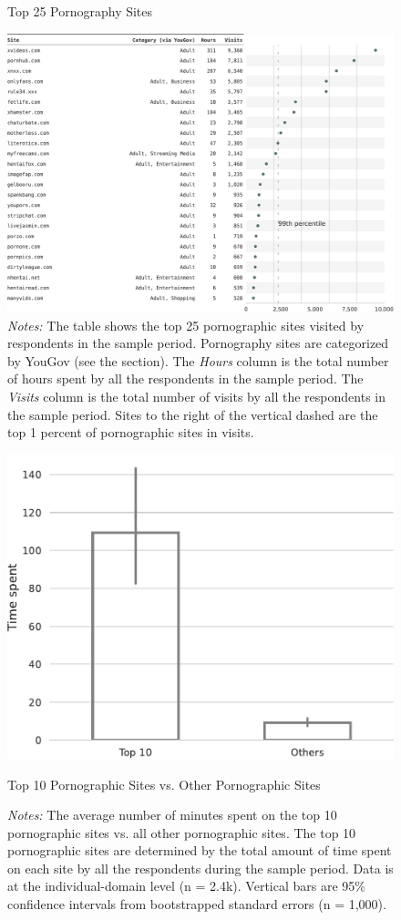 \documentclass[12pt,twoside]{article}
\begin{document}
\begin{figure}[ht]
	\centering
	\caption{Top 25 Pornography Sites}
	\includegraphics[width=\textwidth]{figs/top_25_adultsites.pdf}
	\caption*{\footnotesize \emph{Notes:} 
		The table shows the top 25 pornographic sites visited by respondents in the sample period. Pornography sites are categorized by YouGov (see the  section).
    	The \emph{Hours} column is the total number of hours spent by all the respondents in the sample period.
    	The \emph{Visits} column is the total number of visits by all the respondents in the sample period.
            Sites to the right of the vertical dashed are the top 1 percent of pornographic sites in visits.
	}
	\label{fig:top25_adult}
\end{figure}



\begin{figure}
	\centering
	\includegraphics[width=.5\textwidth]{figs/concentration_porn_consumption.pdf}
	\caption{Top 10 Pornographic Sites vs. Other Pornographic Sites}
	\caption*{\footnotesize \emph{Notes:} 
            The average number of minutes spent on the top 10 pornographic sites vs. all other pornographic sites.
            The top 10 pornographic sites are determined by the total amount of time spent on each site by all the respondents during the sample period.
            Data is at the individual-domain level (n = 2.4k).
		Vertical bars are 95\% confidence intervals from bootstrapped standard errors (n = 1,000).
	}
	\label{fig:concentration_porn_consumption}
\end{figure}
\end{document}
